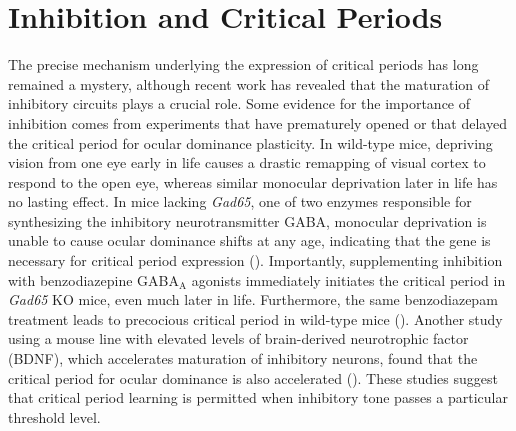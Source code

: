 \section{Inhibition and Critical Periods}
The precise mechanism underlying the expression of critical periods has long remained a mystery, although recent work has revealed that the maturation of inhibitory circuits plays a crucial role. Some evidence for the importance of inhibition comes from experiments that have prematurely opened or that delayed the critical period for ocular dominance plasticity. In wild-type mice, depriving vision from one eye early in life causes a drastic remapping of visual cortex to respond to the open eye, whereas similar monocular deprivation later in life has no lasting effect. In mice lacking \textit{Gad65}, one of two enzymes responsible for synthesizing the inhibitory neurotransmitter GABA, monocular deprivation is unable to cause ocular dominance shifts at any age, indicating that the gene is necessary for critical period expression (\cite{Fagiolini2000}). Importantly, supplementing inhibition with benzodiazepine GABA$_\mathrm{A}$ agonists immediately initiates the critical period in \textit{Gad65} KO mice, even much later in life. Furthermore, the same benzodiazepam treatment leads to precocious critical period in wild-type mice (\cite{Fagiolini2000}). Another study using a mouse line with elevated levels of brain-derived neurotrophic factor (BDNF), which accelerates maturation of inhibitory neurons, found that the critical period for ocular dominance is also accelerated (\cite{Hanover1999, Huang1999}). These studies suggest that critical period learning is permitted when inhibitory tone passes a particular threshold level.

